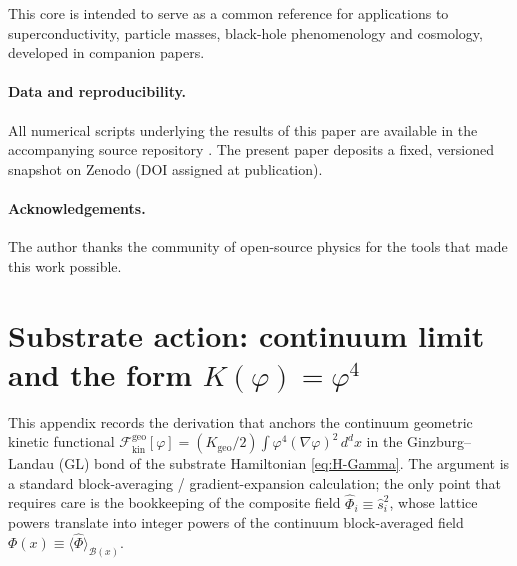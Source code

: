 \documentclass[11pt,a4paper]{article}
\renewcommand{\Phi}{\varPhi}
\begin{document}
This core is intended to serve as a common reference for applications to
superconductivity, particle masses, black-hole phenomenology and cosmology,
developed in companion papers.

\paragraph{Data and reproducibility.} All numerical scripts underlying the
results of this paper are available in the accompanying source repository
\cite{TGP-repo}. The present paper deposits a fixed, versioned snapshot on
Zenodo (DOI assigned at publication).

\paragraph{Acknowledgements.} The author thanks the community of
open-source physics for the tools that made this work possible.

\appendix
\setcounter{section}{1}
\section{Substrate action: continuum limit and the form $K(\varphi)=\varphi^{4}$}
\label{app:substrate-action}

This appendix records the derivation that anchors the continuum
geometric kinetic functional
\(\mathcal{F}_{\mathrm{kin}}^{\mathrm{geo}}[\varphi]=
(K_{\mathrm{geo}}/2)\!\int\!\varphi^{4}(\nabla\varphi)^{2}\,d^{d}x\)
in the Ginzburg--Landau (GL) bond of the substrate Hamiltonian
\eqref{eq:H-Gamma}. The argument is a standard block-averaging /
gradient-expansion calculation; the only point that requires care is
the bookkeeping of the composite field
\(\hat{\Phi}_{i}\equiv\hat{s}_{i}^{2}\), whose lattice powers translate
into integer powers of the continuum block-averaged field
\(\Phi(x)\equiv\langle\hat{\Phi}\rangle_{\mathcal{B}(x)}\).
\end{document}
